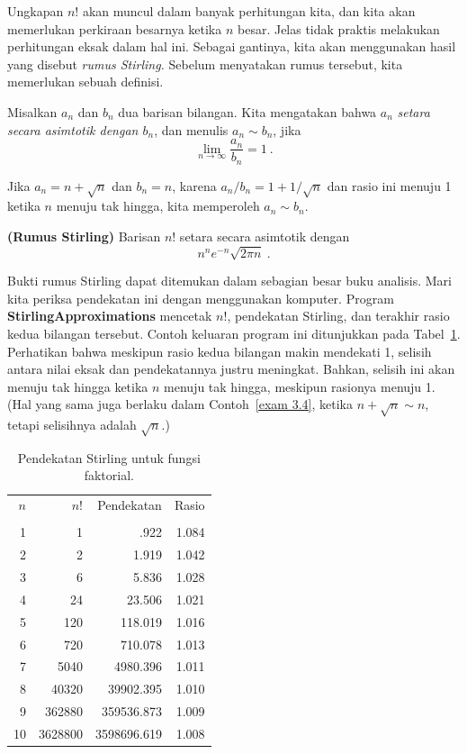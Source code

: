 \par Ungkapan $n!$ akan muncul dalam banyak perhitungan kita, dan kita akan memerlukan
perkiraan besarnya ketika $n$ besar.  Jelas tidak praktis melakukan perhitungan eksak
dalam hal ini.  Sebagai gantinya, kita akan menggunakan hasil yang disebut {\em rumus
Stirling.}  Sebelum menyatakan rumus tersebut, kita memerlukan sebuah definisi.

\begin{definition}\label{def 3.2} Misalkan $a_n$ dan $b_n$ dua barisan bilangan.  Kita
mengatakan bahwa $a_n$ {\em setara secara asimtotik
dengan $b_n$}, dan menulis $a_n \sim b_n$, jika
$$
\lim_{n \to \infty} \frac{a_n}{b_n} = 1\ .
$$
\end{definition}
\begin{example}\label{exam 3.4} Jika $a_n = n + \sqrt n$ dan $b_n = n$, karena
$a_n/b_n = 1 + 1/\sqrt n$ dan rasio ini menuju 1 ketika $n$ menuju tak hingga, kita
memperoleh $a_n \sim b_n$.
\end{example}

\begin{theorem}{\bf (Rumus Stirling)}\label{thm 3.3} Barisan
$n!$ setara secara asimtotik dengan
$$ n^ne^{-n}\sqrt{2\pi n}\ .
$$
\end{theorem}

Bukti rumus Stirling dapat ditemukan dalam sebagian besar buku analisis.  Mari kita
periksa pendekatan ini dengan menggunakan komputer.  Program {\bf
StirlingApproximations} mencetak
$n!$, pendekatan Stirling, dan terakhir rasio kedua bilangan tersebut.  Contoh keluaran
program ini ditunjukkan pada Tabel~\ref{table 3.26}.  Perhatikan bahwa meskipun rasio
kedua bilangan makin mendekati 1, selisih antara nilai eksak dan pendekatannya justru
meningkat.  Bahkan, selisih ini akan menuju tak hingga ketika $n$ menuju tak hingga,
meskipun rasionya menuju 1.  (Hal yang sama juga berlaku dalam Contoh~\ref{exam 3.4},
ketika $n +
\sqrt n \sim n$, tetapi selisihnya adalah $\sqrt n$.)

\begin{table}
\centering
\begin{tabular}{rrrr} $n$     & $n!$ &Pendekatan &Rasio \\
\\ 
1 & 1 & .922 & 1.084\\
2 & 2  & 1.919 & 1.042\\
3 & 6  & 5.836 & 1.028\\
4 & 24 & 23.506 & 1.021\\
5 & 120 & 118.019 & 1.016\\
6 & 720 & 710.078 & 1.013\\
7 & 5040 & 4980.396 & 1.011\\
8 & 40320 & 39902.395 & 1.010\\
9 & 362880 & 359536.873 & 1.009\\
10 & 3628800 & 3598696.619 & 1.008\\

\end{tabular}
\caption{Pendekatan Stirling untuk fungsi faktorial.}
\label{table 3.26}
\end{table}

